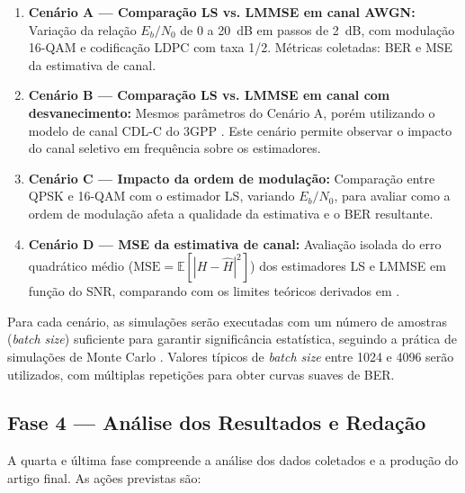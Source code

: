 \documentclass[conference]{IEEEtran}
\begin{document}
\begin{enumerate}
    \item \textbf{Cenário A --- Comparação LS vs. LMMSE em canal AWGN:} Variação da relação $E_b/N_0$ de 0 a 20~dB em passos de 2~dB, com modulação 16-QAM e codificação LDPC com taxa 1/2. Métricas coletadas: BER e MSE da estimativa de canal.

    \item \textbf{Cenário B --- Comparação LS vs. LMMSE em canal com desvanecimento:} Mesmos parâmetros do Cenário A, porém utilizando o modelo de canal CDL-C do 3GPP \cite{3gpp38901}. Este cenário permite observar o impacto do canal seletivo em frequência sobre os estimadores.

    \item \textbf{Cenário C --- Impacto da ordem de modulação:} Comparação entre QPSK e 16-QAM com o estimador LS, variando $E_b/N_0$, para avaliar como a ordem de modulação afeta a qualidade da estimativa e o BER resultante.

    \item \textbf{Cenário D --- MSE da estimativa de canal:} Avaliação isolada do erro quadrático médio ($\text{MSE} = \mathbb{E}[|H - \hat{H}|^2]$) dos estimadores LS e LMMSE em função do SNR, comparando com os limites teóricos derivados em \cite{vanDeBeek1995, edfors1998}.
\end{enumerate}

Para cada cenário, as simulações serão executadas com um número de amostras (\textit{batch size}) suficiente para garantir significância estatística, seguindo a prática de simulações de Monte Carlo \cite{proakis2008}. Valores típicos de \textit{batch size} entre 1024 e 4096 serão utilizados, com múltiplas repetições para obter curvas suaves de BER.

\subsection{Fase 4 --- Análise dos Resultados e Redação}

A quarta e última fase compreende a análise dos dados coletados e a produção do artigo final. As ações previstas são:
\end{document}
